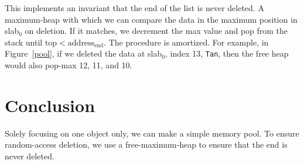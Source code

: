 \documentclass[12pt]{article}
\newcommand{\code}[1]{\colorbox{light-gray}{\texttt{#1}}}
\begin{document}
This implements an invariant that the end of the list is never deleted. A maximum-heap with which we can compare the data in the maximum position in slab$_0$ on deletion. If it matches, we decrement the max value and pop from the stack until $\text{top} < \text{address}_\text{end}$. The procedure is amortized. For example, in Figure~\ref{pool}, if we deleted the data at slab$_0$, index 13, \code{Tan}, then the free heap would also pop-max 12, 11, and 10.


\section{Conclusion}

Solely focusing on one object only, we can make a simple memory pool. To ensure random-access deletion, we use a free-maximum-heap to ensure that the end is never deleted.


\end{document}

